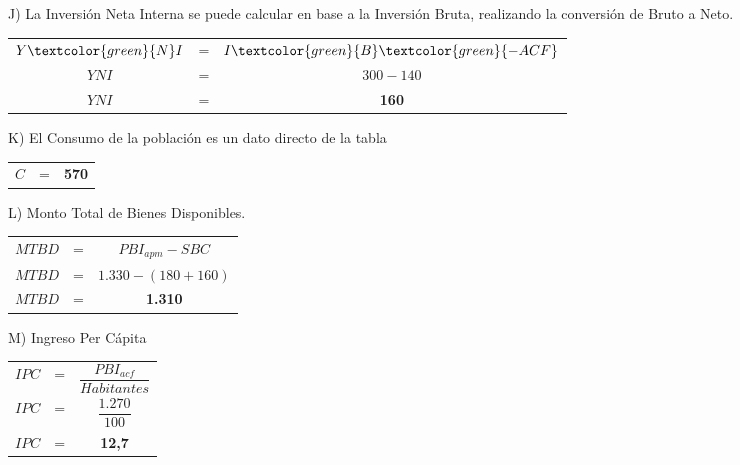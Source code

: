 \documentclass[12pt,a4paper]{article}
\begin{document}
        \hrulefill
        
        J) La Inversión Neta Interna se puede calcular en base a la Inversión Bruta, realizando la conversión de Bruto a Neto.
        
		\begin{table}[H]
		\centering
        	\begin{tabular}{ c c c }
               	$ Y\textcolor{green}{N}I $ &=& $ I\textcolor{green}{B} \textcolor{green}{ - ACF} $ \\
                $ YNI $ &=& $ 300 - 140 $ \\
                $ YNI $ &=& \textbf{160}
			\end{tabular}
		\end{table}
        
        \hrulefill
        
        K) El Consumo de la población es un dato directo de la tabla
        
		\begin{table}[H]
		\centering
        	\begin{tabular}{ c c c }
                $ C $ &=& \textbf{570}
			\end{tabular}
		\end{table}
        
        \hrulefill
        
        L) Monto Total de Bienes Disponibles.
        
		\begin{table}[H]
		\centering
        	\begin{tabular}{ c c c }
               	$ MTBD $ &=& $ PBI_{apm} - SBC $ \\
                $ MTBD $ &=& $ 1{.}330 - ( 180 + 160 ) $ \\
                $ MTBD $ &=& \textbf{1.310}
			\end{tabular}
		\end{table}
        
        \hrulefill
        
        M) Ingreso Per Cápita
        
		\begin{table}[H]
		\centering
        	\begin{tabular}{ c c c }
	            \vspace{0.3cm}
               	$ IPC $ &=& $ \dfrac{PBI_{acf}}{Habitantes} $ \\ \vspace{0.3cm}
                $ IPC $ &=& $ \dfrac{1{.}270}{100}$ \\
                $ IPC $ &=& \textbf{12,7}
			\end{tabular}
		\end{table}
        
\end{document}
